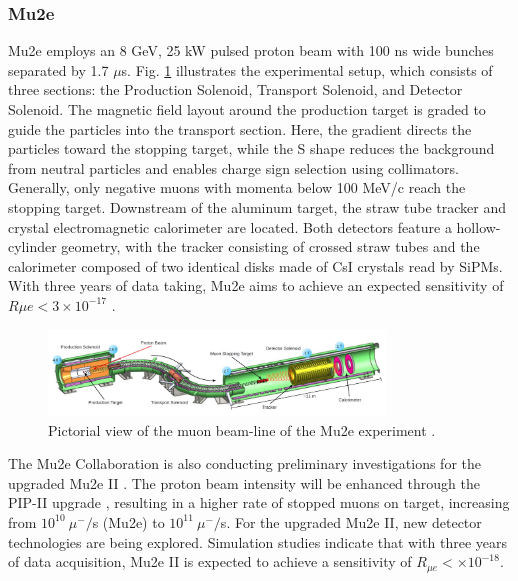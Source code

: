 \begin{refsection}
        \subsubsection{Mu2e}
        Mu2e employs an 8 GeV, 25 kW pulsed proton beam with 100 ns wide bunches separated by 1.7 $\mu$s. 
        Fig. \ref{Mu2e} illustrates the experimental setup, which consists of three sections: the Production Solenoid, Transport Solenoid, and Detector Solenoid. 
        The magnetic field layout around the production target is graded to guide the particles into the transport section. 
        Here, the gradient directs the particles toward the stopping target, while the S shape reduces the background from neutral particles and enables charge sign selection using collimators. 
        Generally, only negative muons with momenta below 100 MeV/c reach the stopping target. 
        Downstream of the aluminum target, the straw tube tracker and crystal electromagnetic calorimeter are located. Both detectors feature a hollow-cylinder geometry, with the tracker consisting of crossed straw tubes and the calorimeter composed of two identical disks made of CsI crystals read by SiPMs. 
        With three years of data taking, Mu2e aims to achieve an expected sensitivity of $R{\mu e}<3\times10^{-17}$ \cite{MTDR}.

        \begin{figure}
            \centering
            \includegraphics[width=0.8\textwidth]{Figures/Introduction/mu2e_apparatus.jpg}
            \caption[cLFV: Mu2e experiment]{Pictorial view of the muon beam-line of the Mu2e experiment \cite{MTDR}.}
        \label{Mu2e}
        \end{figure}
        
        \noindent
        The Mu2e Collaboration is also conducting preliminary investigations for the upgraded Mu2e II \cite{Mu2e_II:2018}. 
        The proton beam intensity will be enhanced through the PIP-II upgrade \cite{PIP_II:2018}, resulting in a higher rate of stopped muons on target, increasing from $10^{10}\ \mu^-/$s (Mu2e) to $10^{11}\ \mu^-/$s. For the upgraded Mu2e II, new detector technologies are being explored. 
        Simulation studies indicate that with three years of data acquisition, Mu2e II is expected to achieve a sensitivity of $R_{\mu e} < \times10^{-18}$.


\end{refsection}
